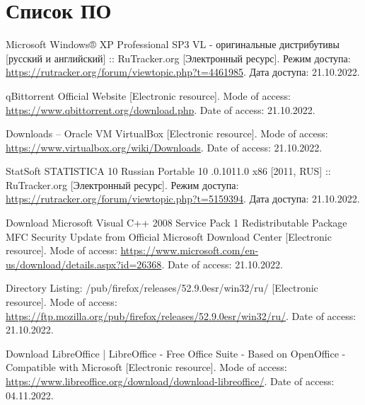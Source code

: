 \newpage

\begingroup
  \section*{Список ПО}

  \renewcommand{\addcontentsline}[3]{}%
  \renewcommand{\section}[2]{}%

  \begin{thebibliography}{}
    Microsoft Windows® XP Professional SP3 VL - оригинальные дистрибутивы [русский и английский] :: RuTracker.org
    [Электронный ресурс].
    Режим доступа: \url{https://rutracker.org/forum/viewtopic.php?t=4461985}.
    Дата доступа: 21.10.2022.

    qBittorrent Official Website
    [Electronic resource].
    Mode of access: \url{https://www.qbittorrent.org/download.php}.
    Date of access: 21.10.2022.

    Downloads – Oracle VM VirtualBox
    [Electronic resource].
    Mode of access: \url{https://www.virtualbox.org/wiki/Downloads}.
    Date of access: 21.10.2022.

    StatSoft STATISTICA 10 Russian Portable 10 .0.1011.0 x86 [2011, RUS] :: RuTracker.org
    [Электронный ресурс].
    Режим доступа: \url{https://rutracker.org/forum/viewtopic.php?t=5159394}.
    Дата доступа: 21.10.2022.
    
    Download Microsoft Visual C++ 2008 Service Pack 1 Redistributable Package MFC Security Update from Official Microsoft Download Center
    [Electronic resource].
    Mode of access: \url{https://www.microsoft.com/en-us/download/details.aspx?id=26368}.
    Date of access: 21.10.2022.

    Directory Listing: /pub/firefox/releases/52.9.0esr/win32/ru/
    [Electronic resource].
    Mode of access: \url{https://ftp.mozilla.org/pub/firefox/releases/52.9.0esr/win32/ru/}.
    Date of access: 21.10.2022.

    Download LibreOffice | LibreOffice - Free Office Suite - Based on OpenOffice - Compatible with Microsoft
    [Electronic resource].
    Mode of access: \url{https://www.libreoffice.org/download/download-libreoffice/}.
    Date of access: 04.11.2022.
  \end{thebibliography}
\endgroup


